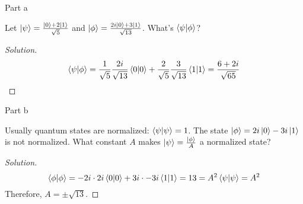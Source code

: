 \begin{solution}{Part a}\label{ques:3a}
  \begin{question}
    Let $\ket{\psi} = \frac{\ket{0} + 2 \ket{1}}{\sqrt{5}}$ and $\ket{\phi} = \frac{2i\ket{0} + 3\ket{1}}{\sqrt{13}}$. What's $\braket{\psi|\phi}$?
  \end{question}
  \tcblower{}
  \begin{proof}[Solution]
    \begin{equation}
      \braket{\psi|\phi} = \frac{1}{\sqrt{5}}\frac{2i}{\sqrt{13}}\braket{0|0} + \frac{2}{\sqrt{5}}\frac{3}{\sqrt{13}}\braket{1|1} = \frac{6 + 2i}{\sqrt{65}}
    \end{equation}
  \end{proof}
\end{solution}

\begin{solution}{Part b}\label{ques:3b}
  \begin{question}
    Usually quantum states are normalized: $\braket{\psi|\psi} = 1$. The state $\ket{\phi} = 2i \ket{0} - 3i \ket{1}$ is not normalized. What constant $A$ makes $\ket{\psi} = \frac{\ket{\phi}}{A}$ a normalized state?
  \end{question}
  \tcblower{}
  \begin{proof}[Solution]
    \begin{equation}
      \braket{\phi|\phi} = -2i\cdot 2i\braket{0|0} + 3i\cdot -3i\braket{1|1} = 13 = A^2\braket{\psi|\psi} = A^2
    \end{equation}
    Therefore, $A = \pm\sqrt{13}$.
  \end{proof}
\end{solution}

